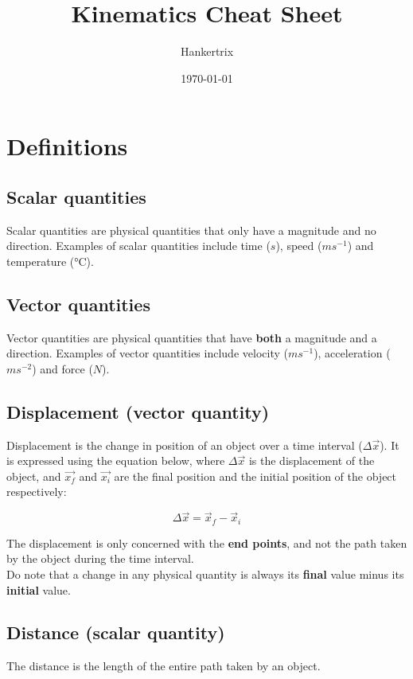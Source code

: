 \documentclass[11pt]{article}
\author{Hankertrix}
\date{\today}
\title{Kinematics Cheat Sheet}
\begin{document}
\maketitle
\setcounter{tocdepth}{2}
\tableofcontents


\section{Definitions}
\label{sec:org90d3c48}

\subsection{Scalar quantities}
\label{sec:org8ec070d}
Scalar quantities are physical quantities that only have a magnitude and no direction. Examples of scalar quantities include time (\(\si{s}\)), speed (\(\si{ms^{-1}}\)) and temperature (\(\si{\celsius}\)).

\subsection{Vector quantities}
\label{sec:orgfeee2d9}
Vector quantities are physical quantities that have \textbf{both} a magnitude and a direction. Examples of vector quantities include velocity (\(\si{ms^{-1}}\)), acceleration (\(\si{ms^{-2}}\)) and force (\(\si{N}\)).

\subsection{Displacement (vector quantity)}
\label{sec:org17ce794}
Displacement is the change in position of an object over a time interval (\(\Delta \vec{x}\)). It is expressed using the equation below, where \(\Delta \vec{x}\) is the displacement of the object, and \(\vec{x_f}\) and \(\vec{x_i}\) are the final position and the initial position of the object respectively:

\[\Delta \vec{x} = \vec{x}_f - \vec{x}_i\]

The displacement is only concerned with the \textbf{end points}, and not the path taken by the object during the time interval.
\\[0pt]

Do note that a change in any physical quantity is always its \textbf{final} value minus its \textbf{initial} value.

\subsection{Distance (scalar quantity)}
\label{sec:org13c276f}
The distance is the length of the entire path taken by an object.
\end{document}
